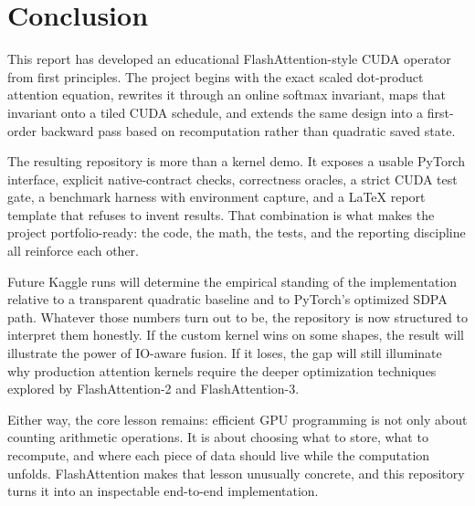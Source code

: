 \chapter{Conclusion}
\label{chap:conclusion}

This report has developed an educational FlashAttention-style CUDA operator from first principles. The project begins with the exact scaled dot-product attention equation, rewrites it through an online softmax invariant, maps that invariant onto a tiled CUDA schedule, and extends the same design into a first-order backward pass based on recomputation rather than quadratic saved state.

The resulting repository is more than a kernel demo. It exposes a usable PyTorch interface, explicit native-contract checks, correctness oracles, a strict CUDA test gate, a benchmark harness with environment capture, and a LaTeX report template that refuses to invent results. That combination is what makes the project portfolio-ready: the code, the math, the tests, and the reporting discipline all reinforce each other.

Future Kaggle runs will determine the empirical standing of the implementation relative to a transparent quadratic baseline and to PyTorch's optimized SDPA path. Whatever those numbers turn out to be, the repository is now structured to interpret them honestly. If the custom kernel wins on some shapes, the result will illustrate the power of IO-aware fusion. If it loses, the gap will still illuminate why production attention kernels require the deeper optimization techniques explored by FlashAttention-2 and FlashAttention-3.

Either way, the core lesson remains: efficient GPU programming is not only about counting arithmetic operations. It is about choosing what to store, what to recompute, and where each piece of data should live while the computation unfolds. FlashAttention makes that lesson unusually concrete, and this repository turns it into an inspectable end-to-end implementation.
